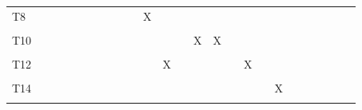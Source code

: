 \documentclass[
]{article}
\begin{document}
\begin{longtable}[l]{lllllllllllllllllllllllll}
T8 &  &  &  &  &  &  &  &  &  & X &  &  &  &  &  &  &  &  &  &  &  &  &  & \\
\cellcolor{gray!6}{T9} & \cellcolor{gray!6}{} & \cellcolor{gray!6}{} & \cellcolor{gray!6}{} & \cellcolor{gray!6}{} & \cellcolor{gray!6}{} & \cellcolor{gray!6}{} & \cellcolor{gray!6}{} & \cellcolor{gray!6}{} & \cellcolor{gray!6}{} & \cellcolor{gray!6}{} & \cellcolor{gray!6}{X} & \cellcolor{gray!6}{X} & \cellcolor{gray!6}{} & \cellcolor{gray!6}{} & \cellcolor{gray!6}{} & \cellcolor{gray!6}{} & \cellcolor{gray!6}{} & \cellcolor{gray!6}{} & \cellcolor{gray!6}{} & \cellcolor{gray!6}{} & \cellcolor{gray!6}{} & \cellcolor{gray!6}{} & \cellcolor{gray!6}{} & \cellcolor{gray!6}{}\\
T10 &  &  &  &  &  &  &  &  &  &  &  &  & X & X &  &  &  &  &  &  &  &  &  & \\
\addlinespace
\cellcolor{gray!6}{T11} & \cellcolor{gray!6}{} & \cellcolor{gray!6}{} & \cellcolor{gray!6}{} & \cellcolor{gray!6}{} & \cellcolor{gray!6}{} & \cellcolor{gray!6}{} & \cellcolor{gray!6}{} & \cellcolor{gray!6}{} & \cellcolor{gray!6}{} & \cellcolor{gray!6}{} & \cellcolor{gray!6}{X} & \cellcolor{gray!6}{} & \cellcolor{gray!6}{} & \cellcolor{gray!6}{} & \cellcolor{gray!6}{X} & \cellcolor{gray!6}{} & \cellcolor{gray!6}{} & \cellcolor{gray!6}{} & \cellcolor{gray!6}{} & \cellcolor{gray!6}{} & \cellcolor{gray!6}{} & \cellcolor{gray!6}{} & \cellcolor{gray!6}{} & \cellcolor{gray!6}{}\\
T12 &  &  &  &  &  &  &  &  &  &  & X &  &  &  &  & X &  &  &  &  &  &  &  & \\
\cellcolor{gray!6}{T13} & \cellcolor{gray!6}{} & \cellcolor{gray!6}{} & \cellcolor{gray!6}{} & \cellcolor{gray!6}{} & \cellcolor{gray!6}{} & \cellcolor{gray!6}{} & \cellcolor{gray!6}{} & \cellcolor{gray!6}{} & \cellcolor{gray!6}{} & \cellcolor{gray!6}{} & \cellcolor{gray!6}{} & \cellcolor{gray!6}{} & \cellcolor{gray!6}{} & \cellcolor{gray!6}{} & \cellcolor{gray!6}{} & \cellcolor{gray!6}{} & \cellcolor{gray!6}{X} & \cellcolor{gray!6}{} & \cellcolor{gray!6}{} & \cellcolor{gray!6}{} & \cellcolor{gray!6}{} & \cellcolor{gray!6}{} & \cellcolor{gray!6}{} & \cellcolor{gray!6}{}\\
T14 &  &  &  &  &  &  &  &  &  &  &  &  &  &  &  &  &  & X &  &  &  &  &  & \\
\cellcolor{gray!6}{T15} & \cellcolor{gray!6}{} & \cellcolor{gray!6}{} & \cellcolor{gray!6}{} & \cellcolor{gray!6}{} & \cellcolor{gray!6}{} & \cellcolor{gray!6}{} & \cellcolor{gray!6}{} & \cellcolor{gray!6}{} & \cellcolor{gray!6}{} & \cellcolor{gray!6}{} & \cellcolor{gray!6}{} & \cellcolor{gray!6}{} & \cellcolor{gray!6}{} & \cellcolor{gray!6}{} & \cellcolor{gray!6}{} & \cellcolor{gray!6}{} & \cellcolor{gray!6}{} & \cellcolor{gray!6}{} & \cellcolor{gray!6}{X} & \cellcolor{gray!6}{} & \cellcolor{gray!6}{} & \cellcolor{gray!6}{} & \cellcolor{gray!6}{} & \cellcolor{gray!6}{}\\

\end{longtable}
\end{document}
